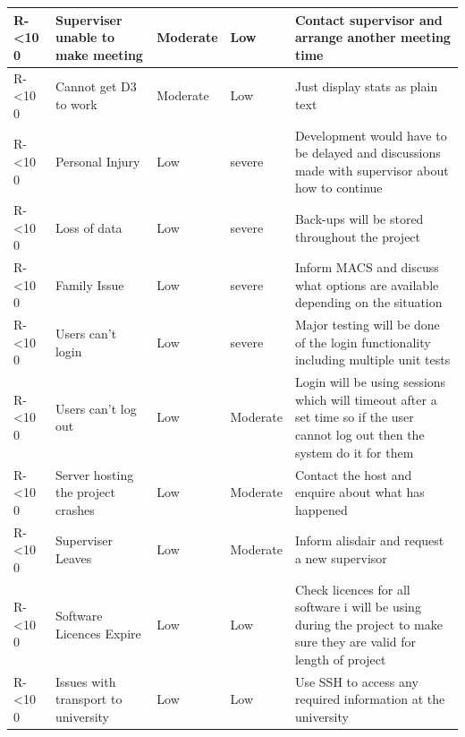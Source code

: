 \documentclass[12pt]{article}  %
\newcommand{\rid}[1]{\centering #1-\ifnum\value{requirement}<10 0\fi\arabic{requirement} \stepcounter{requirement}}
\begin{document}
\begin{spacing}{1.5}
\begin{longtable}{|p{}|p{}|p{}|p{}|p{}|}
\rid{R} & Superviser unable to make meeting & Moderate & Low & Contact supervisor and arrange another meeting time \\ \hline

\rid{R} & Cannot get D3 to work & Moderate & Low & Just display stats as plain text\\ \hline


\rid{R} & Personal Injury & Low & severe & Development would have to be delayed and discussions made with supervisor about how to continue\\ \hline

\rid{R} & Loss of data & Low & severe & Back-ups will be stored throughout the project\\
\hline

\rid{R} & Family Issue & Low & severe  & Inform MACS and discuss what options are available depending on the situation \\ \hline

\rid{R} & Users can't login & Low & severe & Major testing will be done of the login functionality including multiple unit tests\\ \hline

\rid{R} & Users can't log out & Low & Moderate & Login will be using sessions which will timeout after a set time so if the user cannot log out then the system do it for them\\ \hline

\rid{R} & Server hosting the project crashes & Low & Moderate & Contact the host and enquire about what has happened\\ \hline

\rid{R} & Superviser Leaves & Low & Moderate & Inform alisdair and request a new supervisor\\ \hline

\rid{R} & Software Licences Expire & Low & Low & Check licences for all software i will be using during the project to make sure they are valid for length of project\\ \hline

\rid{R} & Issues with transport to university  & Low & Low & Use SSH to access any required information at the university  \\ \hline


\end{longtable}
\end{spacing}



\newpage
\end{document}
